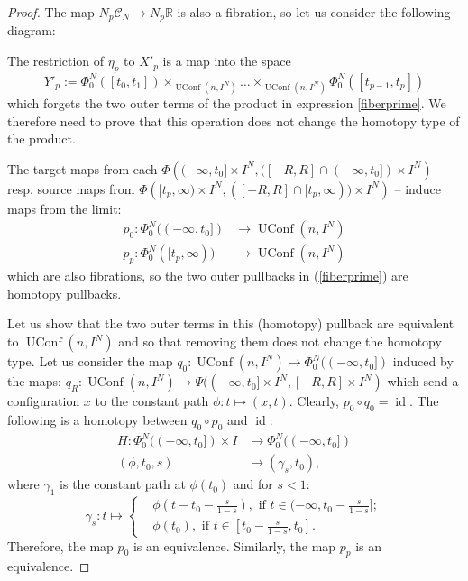 \documentclass[10pt,a4paper]{amsart}
\newcommand{\C}{\mathcal{C}}
\DeclareMathOperator{\UConf}{UConf}
\DeclareMathOperator{\id}{id}
\begin{document}
\begin{proof}
The map $N_p\C_N\rightarrow N_p\mathbb{R}$ is also a fibration, so let us consider the following diagram:
\begin{center}
\end{center}
The restriction of $\eta_p$ to $X'_p$ is a map into the space
\[Y'_p:= \Phi_0^N([t_0,t_1])\times_{\UConf(n,I^N)}\dots\times_{\UConf(n,I^N)}\Phi_0^N([t_{p-1},t_{p}])\]
which forgets the two outer terms of the product in expression \ref{fiberprime}. 
We therefore need to prove that this operation does not change the homotopy type of the product.

The target maps from each $\Phi\left((-\infty,t_0]\times I^N, ([-R,R]\cap(-\infty,t_0])\times I^N\right)$ -- resp. source maps from $\Phi\left([t_p,\infty)\times I^N, ([-R,R]\cap[t_p,\infty))\times I^N\right)$ -- induce maps from the limit:
\begin{align*}
p_0: \Phi_0^N((-\infty,t_0])&\rightarrow \UConf(n,I^N)\\
p_p: \Phi_0^N([t_p,\infty))&\rightarrow \UConf(n,I^N)
\end{align*}
which are also fibrations, so the two outer pullbacks in (\ref{fiberprime}) are homotopy pullbacks.

Let us show that the two outer terms in this (homotopy) pullback are equivalent to $\UConf(n,I^N)$
and so that removing them does not change the homotopy type.
Let us consider the map $q_0:\UConf(n,I^N)\rightarrow \Phi_0^N((-\infty,t_0])$ induced by the maps:
$q_R:\UConf(n,I^N)\rightarrow \Psi((-\infty,t_0]\times I^N, [-R,R]\times I^N)$ which send a configuration $x$ to the constant path $\phi:t\mapsto (x,t)$.
Clearly, $p_0\circ q_0 = \id$. The following is a homotopy between $q_0\circ p_0$ and $\id$:
\begin{align*}
H: \Phi_0^N((-\infty,t_0])\times I &\rightarrow \Phi_0^N((-\infty,t_0])\\
(\phi,t_0,s) &\mapsto (\gamma_s,t_0),
\end{align*}
where $\gamma_1$ is the constant path at $\phi(t_0)$ and for $s<1$:
$$\gamma_s:t \mapsto \begin{cases}
&\phi(t-t_0-\frac{s}{1-s}),\text{ if }t\in(-\infty,t_0-\frac{s}{1-s}];\\ 
&\phi(t_0),\text{ if }t\in[t_0-\frac{s}{1-s},t_0].
\end{cases}$$ 
Therefore, the map $p_0$ is an equivalence.
Similarly, the map $p_p$ is an equivalence.


\end{proof}
\end{document}
